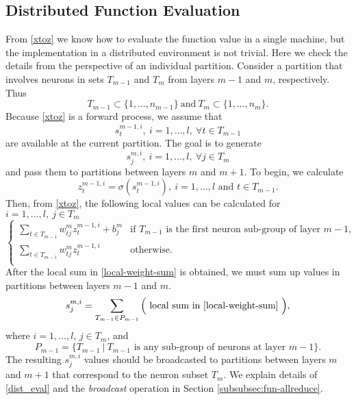 \documentclass[12pt]{article}
\begin{document}
\subsection{Distributed Function Evaluation}
\label{subsec:Distributed-Function}
\par From \eqref{xtoz} we know how to evaluate the function value in a single machine, but the implementation in a distributed environment is not trivial.
Here we check the details from the perspective of an individual partition. 
Consider a partition that involves neurons in sets $T_{m-1}$ and $T_m$ from layers $m-1$ and $m$, respectively. Thus
\begin{equation*}
T_{m-1} \subset \{1,\ldots,n_{m-1}\}\ \text{and}\ T_{m} \subset \{1,\ldots,n_{m}\}.
\end{equation*}
Because \eqref{xtoz} is a forward process, we assume that
\begin{equation*}
s^{m-1,i}_t,\ i=1,\ldots,l,\ \forall t \in T_{m-1}
\end{equation*}
are available at the current partition. The goal is to generate
\begin{equation*}
s^{m,i}_j,\ i=1,\ldots,l,\ \forall j \in T_m
\end{equation*}
and pass them to partitions between layers $m$ and $m+1$. 
To begin, we calculate
\begin{equation} 
\label{z-alg}
	z^{m-1,i}_t = \sigma(s^{m-1,i}_t),\ i = 1, \ldots, l \text{ and } t \in T_{m-1}.
\end{equation}
Then, from \eqref{xtoz}, the following local values can be calculated for $i=1,\ldots,l,\ j \in T_m$
\begin{equation}
\label{local-weight-sum}
\begin{cases}
\sum_{t \in T_{m-1}} w_{tj}^m z^{m-1,i}_t + b^m_j & \text{if $T_{m-1}$ is the first neuron sub-group of layer $m-1$},\\
\sum_{t \in T_{m-1}} w_{tj}^m z^{m-1,i}_t & \text{otherwise}.\\
\end{cases}
\end{equation}
After the local sum in \eqref{local-weight-sum} is obtained, we must sum up values in partitions between layers $m-1$ and $m$.
\begin{equation}
    s^{m,i}_j = \sum_{T_{m-1} \in P_{m-1}} \Big(\text{ local sum in \eqref{local-weight-sum} }\Big),
\label{dist_eval}
\end{equation}
where $i=1,\ldots,l$, $j \in T_m$, and
\begin{equation*}
	P_{m-1} = \{ T_{m-1} \ |\  T_{m-1} \text{ is any sub-group of neurons at layer $m-1$}\}.
\end{equation*}
The resulting $s^{m,i}_j$ values should be broadcasted to partitions between layers $m$ and $m+1$ that correspond to the neuron subset $T_m$.
We explain details of \eqref{dist_eval} and the {\it broadcast} operation in Section \ref{subsubsec:fun-allreduce}.
\end{document}
